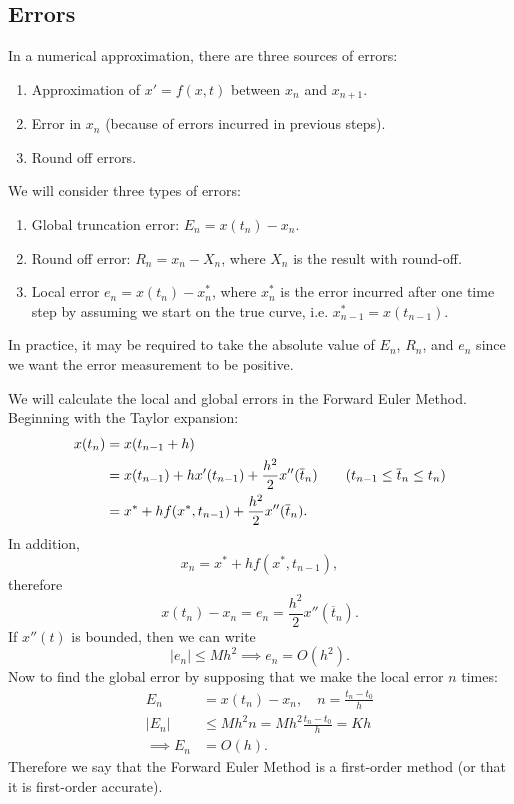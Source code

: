 \subsection{Errors}

In a numerical approximation, there are three sources of errors:
\begin{enumerate}
	\item Approximation of $x' = f(x,t)$ between $x_n$ and $x_{n+1}$.
	\item Error in $x_n$ (because of errors incurred in previous steps).
	\item Round off errors.
\end{enumerate}

We will consider three types of errors:
\begin{enumerate}
	\item Global truncation error: $E_n = x(t_n) - x_n$.
	\item Round off error: $R_n = x_n - X_n$, where $X_n$ is the result with round-off.
	\item Local error $e_n = x(t_n) - x_n^*$, where $x_n^*$ is the error incurred after one time step by assuming we start on the true curve, i.e. $x_{n-1}^* = x(t_{n-1})$.
\end{enumerate}

In practice, it may be required to take the absolute value of $E_n$, $R_n$, and $e_n$ since we want the error measurement to be positive.

\begin{eg}
	We will calculate the local and global errors in the Forward Euler Method. Beginning with the Taylor expansion:
	\begin{align*}
		x(t_n) &= x(t_{n-1} + h) \\ 
		&= x(t_{n-1}) + hx'(t_{n-1}) + \frac{h^2}{2}x''(\overline{t}_n) \tag{$t_{n-1} \leq \overline{t}_n \leq t_n$} \\
		&= x^* + hf(x^*, t_{n-1}) + \frac{h^2}{2}x''(\overline{t}_n).
	\end{align*}
	In addition,
	\[
	x_n = x^* + h f(x^*, t_{n-1}),
	\]
	therefore
	\[
	x(t_n) - x_n = e_n = \frac{h^2}{2}x''(\overline{t}_n).
	\]
	If $x''(t)$ is bounded, then we can write
	\[
	|e_n| \leq M h^2 \implies e_n = O(h^2).
	\]
	Now to find the global error by supposing that we make the local error $n$ times:
	\begin{align*}
		E_n &= x(t_n) - x_n, \quad n = \frac{t_n-t_0}{h} \\
		|E_n| &\leq M h^2 n = M h^2 \frac{t_n-t_0}{h} = Kh \\
		\implies E_n &= O(h).
	\end{align*}
	Therefore we say that the Forward Euler Method is a first-order method (or that it is first-order accurate).
\end{eg}

